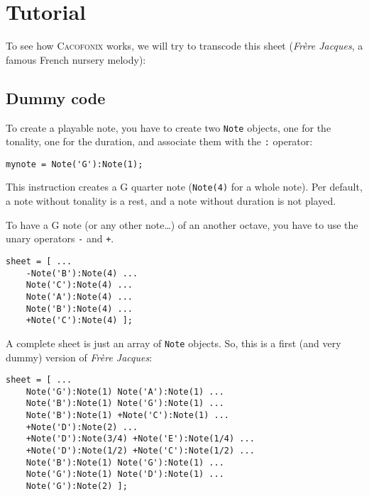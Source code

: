 \documentclass{article}
\newcommand\cacofonix{\textsc{Cacofonix}\xspace}
\newcommand\note{\lstinline!Note!\xspace}
\newcommand\frerejaques{\emph{Fr\`ere Jacques}\xspace}
\begin{document}
\section{Tutorial}

To see how \cacofonix works, we will try to transcode this sheet (\frerejaques, a famous French nursery melody):\\

\subsection{Dummy code}

To create a playable note, you have to create two \note objects, one for the tonality, one for the duration, and associate them with the \lstinline!:! operator:
\begin{lstlisting}
mynote = Note('G'):Note(1);
\end{lstlisting}
This instruction creates a G quarter note (\lstinline!Note(4)! for a whole note). Per default, a note without tonality is a rest, and a note without duration is not played.

To have a G note (or any other note\dots) of an another octave, you have to use the unary operators \lstinline!-! and \lstinline!+!. \\
\begin{lstlisting}
sheet = [ ...
	-Note('B'):Note(4) ...
	Note('C'):Note(4) ...
	Note('A'):Note(4) ...
	Note('B'):Note(4) ...
	+Note('C'):Note(4) ];
\end{lstlisting}

A complete sheet is just an array of \lstinline!Note! objects. So, this is a first (and very dummy) version of \frerejaques:
\begin{lstlisting}
sheet = [ ...
	Note('G'):Note(1) Note('A'):Note(1) ...
	Note('B'):Note(1) Note('G'):Note(1) ...
	Note('B'):Note(1) +Note('C'):Note(1) ...
	+Note('D'):Note(2) ...
	+Note('D'):Note(3/4) +Note('E'):Note(1/4) ...
	+Note('D'):Note(1/2) +Note('C'):Note(1/2) ...
	Note('B'):Note(1) Note('G'):Note(1) ...
	Note('G'):Note(1) Note('D'):Note(1) ...
	Note('G'):Note(2) ];
\end{lstlisting}
\end{document}
